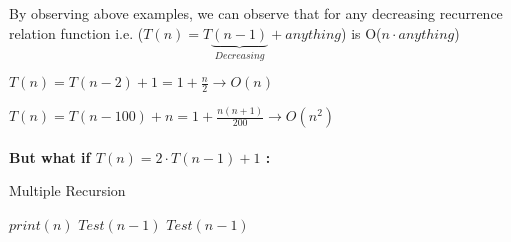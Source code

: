 \documentclass[]{article}
\begin{document}
    By observing above examples, we can observe that for any decreasing recurrence relation function i.e. ($T(n) = T\underbrace{(n-1)}_{Decreasing} + anything$) is O($n \cdot anything$)

$T(n) = T(n-2) + 1 = 1 + \frac{n}{2} \longrightarrow O(n) $

$T(n) = T(n-100) + n = 1 + \frac{n(n+1)}{200} \longrightarrow O(n^2) $
\\\\
\textbf{But what if $T(n) = 2 \cdot T(n -1) + 1$ :}
\begin{algorithm}[H]
    \caption{Multiple Recursion}
    \label{printRecursion}
    \begin{algorithmic}
         
            \State$print(n)$ 
            \State$Test(n-1)$  
            \State$Test(n-1)$  
        \EndIf
        \EndProcedure
    \end{algorithmic}
\end{algorithm}
\end{document}
